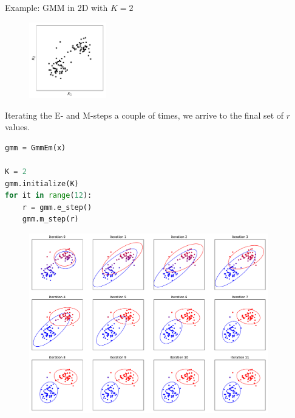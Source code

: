 \newpage
\no Example: GMM in 2D with $K=2$
\begin{figure}[h]
\centering
	\includegraphics[width=0.30\textwidth]{./figs/05-gmm-data.pdf}
\end{figure}

\no Iterating the E- and M-steps a couple of times, we arrive to the final set of $r$ values.
\begin{lstlisting}[language=python]
gmm = GmmEm(x)

K = 2
gmm.initialize(K)
for it in range(12):
    r = gmm.e_step()
    gmm.m_step(r)
\end{lstlisting}

\begin{figure}[h!]
\centering
	\includegraphics[width=0.93\textwidth]{./figs/05-gmm-iterations.pdf}
\end{figure}





